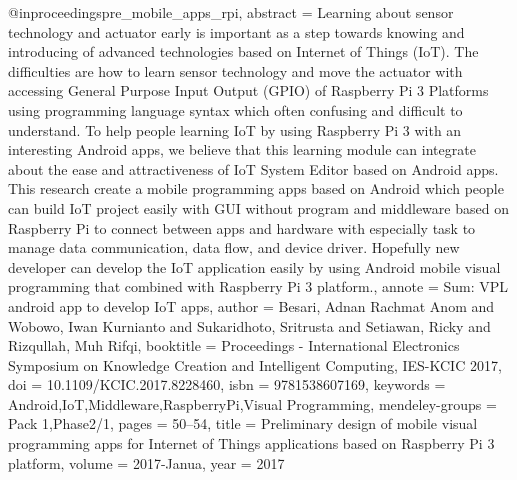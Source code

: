 @inproceedings{pre_mobile_apps_rpi,
    abstract = {Learning about sensor technology and actuator early is important as a step towards knowing and introducing of advanced technologies based on Internet of Things (IoT). The difficulties are how to learn sensor technology and move the actuator with accessing General Purpose Input Output (GPIO) of Raspberry Pi 3 Platforms using programming language syntax which often confusing and difficult to understand. To help people learning IoT by using Raspberry Pi 3 with an interesting Android apps, we believe that this learning module can integrate about the ease and attractiveness of IoT System Editor based on Android apps. This research create a mobile programming apps based on Android which people can build IoT project easily with GUI without program and middleware based on Raspberry Pi to connect between apps and hardware with especially task to manage data communication, data flow, and device driver. Hopefully new developer can develop the IoT application easily by using Android mobile visual programming that combined with Raspberry Pi 3 platform.},
    annote = {Sum: VPL android app to develop IoT apps},
    author = {Besari, Adnan Rachmat Anom and Wobowo, Iwan Kurnianto and Sukaridhoto, Sritrusta and Setiawan, Ricky and Rizqullah, Muh Rifqi},
    booktitle = {Proceedings - International Electronics Symposium on Knowledge Creation and Intelligent Computing, IES-KCIC 2017},
    doi = {10.1109/KCIC.2017.8228460},
    isbn = {9781538607169},
    keywords = {Android,IoT,Middleware,RaspberryPi,Visual Programming},
    mendeley-groups = {Pack 1,Phase2/1},
    pages = {50--54},
    title = {{Preliminary design of mobile visual programming apps for Internet of Things applications based on Raspberry Pi 3 platform}},
    volume = {2017-Janua},
    year = {2017}
}

